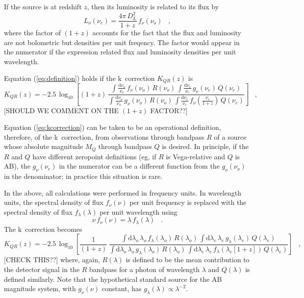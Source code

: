 \documentclass[preprint]{aastex}
\begin{document}
If the source is at redshift $z$, then its luminosity is related to
its flux by
\begin{equation}
L_{\nu}(\nu_e) = \frac{4\pi\,D_L^2}{1+z}\,f_{\nu}(\nu_o) \;\;\;,
\end{equation}
where the factor of $(1+z)$ accounts for the fact that the flux and
luminosity are not bolometric but densities per unit freqency.  The
factor would appear in the numerator if the expression related flux
and luminosity densities per unit wavelength.

Equation (\ref{eq:definition}) holds if the k~correction $K_{QR}(z)$
is
\begin{equation}
\label{eq:kcorrection}
K_{QR}(z) = -2.5\,\log_{10}\left[(1+z)\,
  \frac{\displaystyle
          \int\frac{\mathrm{d}\nu_o}{\nu_o}\,f_{\nu}(\nu_o)\,R(\nu_o)\,
          \int\frac{\mathrm{d}\nu_e}{\nu_e}\,g_{\nu}(\nu_e)\,Q(\nu_e)}
       {\displaystyle
          \int\frac{\mathrm{d}\nu_o}{\nu_o}\,g_{\nu}(\nu_o)\,R(\nu_o)\,
          \int\frac{\mathrm{d}\nu_e}{\nu_e}\,
            f_{\nu}\left(\frac{\nu_e}{1+z}\right)\,Q(\nu_e)}
\right] \;\;\;,
\end{equation}
[SHOULD WE COMMENT ON THE $(1+z)$ FACTOR??]

Equation (\ref{eq:kcorrection}) can be taken to be an operational
definition, therefore, of the k~correction, from observations through
bandpass $R$ of a source whose absolute magnitude $M_Q$ through
bandpass $Q$ is desired.  In principle, if the $R$ and $Q$ have
different zeropoint definitions (eg, if $R$ is Vega-relative and $Q$
is AB), the $g_{\nu}(\nu_e)$ in the numerator can be a different
function from the $g_{\nu}(\nu_o)$ in the denominator; in practice
this situation is rare.

In the above, all calculations were performed in frequency units.  In
wavelength units, the spectral density of flux $f_{\nu}(\nu)$ per unit
frequency is replaced with the spectral density of flux
$f_{\lambda}(\lambda)$ per unit wavelength using
\begin{equation}
\nu\,f_{\nu}(\nu) = \lambda\,f_{\lambda}(\lambda) \;\;\;.
\end{equation}
The k~correction becomes
\begin{equation}
K_{QR}(z) = -2.5\,\log_{10}\left[\frac{1}{(1+z)}\,
  \frac{\displaystyle
    \int\mathrm{d}\lambda_o\,\lambda_o\,f_{\lambda}(\lambda_o)\,R(\lambda_o)\,
      \int\mathrm{d}\lambda_e\,\lambda_e\,
      g_{\lambda}(\lambda_e)\,     Q(\lambda_e)}
       {\displaystyle
    \int\mathrm{d}\lambda_o\,\lambda_o\,g_{\lambda}(\lambda_o)\,R(\lambda_o)\,
      \int\mathrm{d}\lambda_e\,\lambda_e\,
      f_{\lambda}(\lambda_e[1+z])\,Q(\lambda_e)}
\right] \;\;\;,
\end{equation}
[CHECK THIS??] where, again, $R(\lambda)$ is defined to be the mean
contribution to the detector signal in the $R$ bandpass for a photon
of wavelength $\lambda$ and $Q(\lambda)$ is defined similarly.  Note
that the hypothetical standard source for the AB magnitude system,
with $g_{\nu}(\nu)$ constant, has
$g_{\lambda}(\lambda)\propto\lambda^{-2}$.
\end{document}
